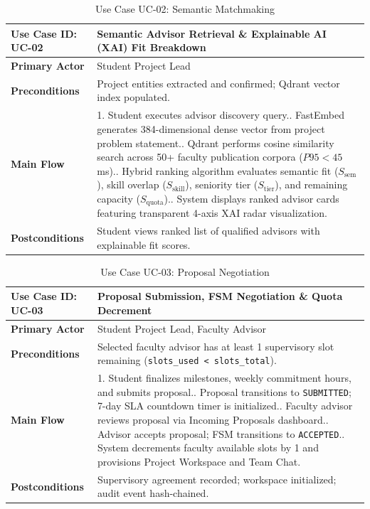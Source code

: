 \documentclass[10.5pt,a4paper]{article}
\begin{document}
\begin{table}[h]
\centering
\footnotesize
\begin{tabularx}{\linewidth}{|l|X|}
\hline
\rowcolor{headergray} \textbf{Use Case ID: UC-02} & \textbf{Semantic Advisor Retrieval \& Explainable AI (XAI) Fit Breakdown} \\ \hline
\textbf{Primary Actor} & Student Project Lead \\ \hline
\textbf{Preconditions} & Project entities extracted and confirmed; Qdrant vector index populated. \\ \hline
\textbf{Main Flow} & 
1. Student executes advisor discovery query.\newline
2. FastEmbed generates 384-dimensional dense vector from project problem statement.\newline
3. Qdrant performs cosine similarity search across 50+ faculty publication corpora ($P95 < 45$ms).\newline
4. Hybrid ranking algorithm evaluates semantic fit ($S_{\text{sem}}$), skill overlap ($S_{\text{skill}}$), seniority tier ($S_{\text{tier}}$), and remaining capacity ($S_{\text{quota}}$).\newline
5. System displays ranked advisor cards featuring transparent 4-axis XAI radar visualization. \\ \hline
\textbf{Postconditions} & Student views ranked list of qualified advisors with explainable fit scores. \\ \hline
\end{tabularx}
\caption{Use Case UC-02: Semantic Matchmaking}
\end{table}

\begin{table}[h]
\centering
\footnotesize
\begin{tabularx}{\linewidth}{|l|X|}
\hline
\rowcolor{headergray} \textbf{Use Case ID: UC-03} & \textbf{Proposal Submission, FSM Negotiation \& Quota Decrement} \\ \hline
\textbf{Primary Actor} & Student Project Lead, Faculty Advisor \\ \hline
\textbf{Preconditions} & Selected faculty advisor has at least 1 supervisory slot remaining (\texttt{slots\_used < slots\_total}). \\ \hline
\textbf{Main Flow} & 
1. Student finalizes milestones, weekly commitment hours, and submits proposal.\newline
2. Proposal transitions to \texttt{SUBMITTED}; 7-day SLA countdown timer is initialized.\newline
3. Faculty advisor reviews proposal via Incoming Proposals dashboard.\newline
4. Advisor accepts proposal; FSM transitions to \texttt{ACCEPTED}.\newline
5. System decrements faculty available slots by 1 and provisions Project Workspace and Team Chat. \\ \hline
\textbf{Postconditions} & Supervisory agreement recorded; workspace initialized; audit event hash-chained. \\ \hline
\end{tabularx}
\caption{Use Case UC-03: Proposal Negotiation}
\end{table}
\end{document}
